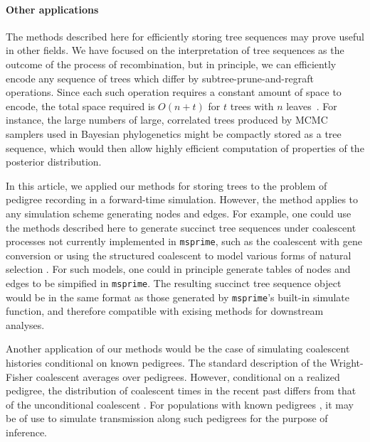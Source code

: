 \documentclass{article}
\newcommand{\msprime}{\texttt{msprime}}
\begin{document}

\paragraph{Other applications}
The methods described here for efficiently storing tree sequences may prove useful in other fields.
We have focused on the interpretation of tree sequences as the outcome of the process
of recombination, but in principle, we can efficiently encode any
sequence of trees which differ by subtree-prune-and-regraft
operations. Since each such operation requires a constant amount of space to encode, the total
space required is $O(n + t)$ for $t$ trees with $n$ leaves~\citep{kelleher2016efficient}.
For instance, the large numbers of large, correlated trees produced by
MCMC samplers used in Bayesian phylogenetics \citep[e.g.,][]{drummond2012bayesian}
might be compactly stored as a tree sequence,
which would then allow highly efficient computation of properties of the posterior distribution.

In this article, we applied our methods for storing trees to the problem of pedigree recording in a forward-time
simulation.  However, the method applies to any simulation scheme generating nodes and edges.  For example, one could
use the methods described here to generate succinct tree sequences under coalescent processes not currently implemented
in \msprime{}, such as the coalescent with gene conversion \citep{Wiuf2000-rc} or using the structured coalescent to
model various forms of natural selection \citep{Kaplan1988-in,Kaplan1989-rt,Braverman1995-gn}.  For such models, one
could in principle generate tables of nodes and edges to be simpified in \msprime{}.  The resulting succinct tree
sequence object would be in the same format as those generated by \msprime{}'s built-in simulate function, and therefore
compatible with exising methods for downstream analyses.

Another application of our methods would be the case of simulating coalescent histories conditional on known pedigrees.
The standard description of the Wright-Fisher coalescent averages over pedigrees.  However, conditional on a realized
pedigree, the distribution of coalescent times in the recent past differs from that of the unconditional coalescent
\citep{Wakeley2012-kw}.  For populations with known pedigrees \citep[\textit{e.g.}][]{Aguillon2017-ac}, it may be of use to
simulate transmission along such pedigrees for the purpose of inference.
\end{document}
